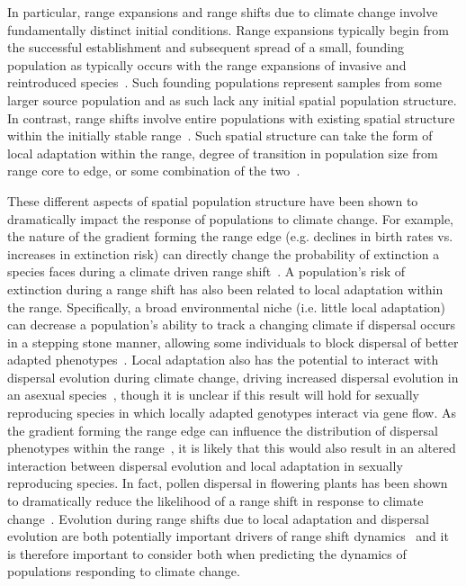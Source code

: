 \documentclass[11pt, oneside]{article}
\begin{document}
In particular, range expansions and range shifts due to climate change involve fundamentally distinct initial conditions. Range expansions typically begin from the successful establishment and subsequent spread of a small, founding population as typically occurs with the range expansions of invasive and reintroduced species~\citep{hastings2005spatial}. Such founding populations represent samples from some larger source population and as such lack any initial spatial population structure. In contrast, range shifts involve entire populations with existing spatial structure within the initially stable range~\citep{hargreaves2014evolution}. Such spatial structure can take the form of local adaptation within the range, degree of transition in population size from range core to edge, or some combination of the two~\citep{hargreaves2014evolution, hargreaves2015fitness, henry2013eco}. 

These different aspects of spatial population structure have been shown to dramatically impact the response of populations to climate change. For example, the nature of the gradient forming the range edge (e.g. declines in birth rates vs. increases in extinction risk) can directly change the probability of extinction a species faces during a climate driven range shift~\citep{henry2013eco}. A population's risk of extinction during a range shift has also been related to local adaptation within the range. Specifically, a broad environmental niche (i.e. little local adaptation) can decrease a population's ability to track a changing climate if dispersal occurs in a stepping stone manner, allowing some individuals to block dispersal of better adapted phenotypes~\citep{atkins2010local}. Local adaptation also has the potential to interact with dispersal evolution during climate change, driving increased dispersal evolution in an asexual species~\citep{hargreaves2015fitness}, though it is unclear if this result will hold for sexually reproducing species in which locally adapted genotypes interact via gene flow. As the gradient forming the range edge can influence the distribution of dispersal phenotypes within the range~\citep{henry2013eco, hargreaves2014evolution}, it is likely that this would also result in an altered interaction between dispersal evolution and local adaptation in sexually reproducing species. In fact, pollen dispersal in flowering plants has been shown to dramatically reduce the likelihood of a range shift in response to climate change~\citep{aguilee2016pollen}. Evolution during range shifts due to local adaptation and dispersal evolution are both potentially important drivers of range shift dynamics~\citep{van2016spatial} and it is therefore important to consider both when predicting the dynamics of populations responding to climate change.
\end{document}
